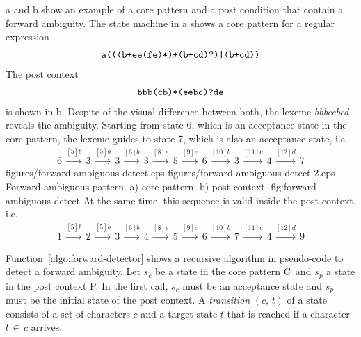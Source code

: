 \documentclass[acmtoplas]{acmtrans2m}
\newcommand{\Funcref}[1]{Function~\ref{algo:#1}}
\newcommand{\pP}{{\sf P}}
\newcommand{\pC}{{\sf C}}
\begin{document}
a and
b show an example of a core pattern and a
post condition that contain a forward ambiguity. The state machine in
a shows a core pattern for a regular
expression 
\begin{eqnarray}
\mbox{\tt a(((b+ee(fe)*)+(b+cd)?)|(b+cd))}
\end{eqnarray}
The post context
\begin{eqnarray}
\mbox{{\tt bbb(cb)*(eebc)?de}} 
\end{eqnarray}
is shown in b.  Despite of the visual difference
between both, the lexeme {\it bbbeebcd} reveals the
ambiguity. Starting from state 6, which is an acceptance state in the core
pattern, the lexeme guides to state 7, which is also an acceptance state, i.e. 
\begin{eqnarray}
6 \, \stackrel{[5]b}{\longrightarrow} \,
3 \, \stackrel{[5]b}{\longrightarrow} \,
3 \, \stackrel{[6]b}{\longrightarrow} \,
3 \, \stackrel{[8]e}{\longrightarrow} \,
5 \, \stackrel{[9]e}{\longrightarrow} \,
6 \, \stackrel{[10]b}{\longrightarrow} \,
3 \, \stackrel{[11]c}{\longrightarrow} \,
4 \, \stackrel{[12]d}{\longrightarrow} \,
7
\end{eqnarray}
\showdpic
{figures/forward-ambiguous-detect.eps}
{figures/forward-ambiguous-detect-2.eps}
{Forward ambiguous pattern. a) core pattern. b) post context.}
{fig:forward-ambiguous-detect}
At the same time, this sequence is valid inside the post context, i.e. 
\begin{eqnarray}
1 \, \stackrel{[5]b}{\longrightarrow} \,
2 \, \stackrel{[5]b}{\longrightarrow} \,
3 \, \stackrel{[6]b}{\longrightarrow} \,
4 \, \stackrel{[8]e}{\longrightarrow} \,
5 \, \stackrel{[9]e}{\longrightarrow} \,
6 \, \stackrel{[10]b}{\longrightarrow} \,
7 \, \stackrel{[11]c}{\longrightarrow} \,
4 \, \stackrel{[12]d}{\longrightarrow} \,
9
\end{eqnarray}

\Funcref{forward-detector}
shows a recursive algorithm in pseudo-code to detect a forward ambiguity. Let
$s_c$ be a state in the core pattern \pC\ and $s_p$ a state in the 
post context \pP. In the first call, $s_c$ must be an acceptance state and
$s_p$ must be the initial state of the post context.
A {\it transition} $(c,\,t)$ of a state consists of a set of characters $c$ and
a target state $t$ that is reached if a character $l\,\in\,c$ arrives.
\end{document}

